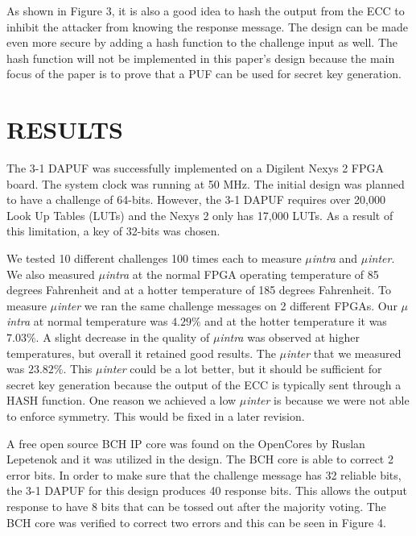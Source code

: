 \documentclass[letterpaper, 10 pt, conference]{ieeeconf}  %
\begin{document}
As shown in Figure 3, it is also a good idea to hash the output from the ECC to inhibit the attacker from knowing the response message.  The design can be made even more secure by adding a hash function to the challenge input as well.  The hash function will not be implemented in this paper's design because the main focus of the paper is to prove that a PUF can be used for secret key generation.  

\section{RESULTS}
 
The 3-1 DAPUF was successfully implemented on a Digilent Nexys 2 FPGA board.  The system clock was running at 50 MHz.  The initial design was planned to have a challenge of 64-bits.  However, the 3-1 DAPUF requires over 20,000 Look Up Tables (LUTs) and the Nexys 2 only has 17,000 LUTs.  As a result of this limitation, a key of 32-bits was chosen.

We tested 10 different challenges 100 times each to measure \emph{$\mu$intra} and \emph{$\mu$inter}.  We also measured \emph{$\mu$intra} at the normal FPGA operating temperature of 85 degrees Fahrenheit and at a hotter temperature of 185 degrees Fahrenheit.  To measure \emph{$\mu$inter}  we ran the same challenge messages on 2 different FPGAs.  Our  \emph{$\mu$intra} at normal temperature was $4.29\%$ and at the hotter temperature it was $7.03\%$.  A slight decrease in the quality of \emph{$\mu$intra} was observed at higher temperatures, but overall it retained good results.  The \emph{$\mu$inter} that we measured was $23.82\%$.  This \emph{$\mu$inter} could be a lot better, but it should be sufficient for secret key generation because the output of the ECC is typically sent through a HASH function.  One reason we achieved a low \emph{$\mu$inter} is because we were not able to enforce symmetry.   This would be fixed in a later revision.
        
A free open source BCH IP core was found on the OpenCores by Ruslan Lepetenok and it was utilized in the design.  The BCH core is able to correct 2 error bits.  In order to make sure that the challenge message has 32 reliable bits, the 3-1 DAPUF for this design produces 40 response bits.  This allows the output response to have 8 bits that can be tossed out after the majority voting.  The BCH core was verified to correct two errors and this can be seen in Figure 4.
\end{document}
